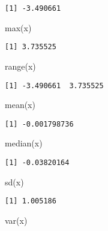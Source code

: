 \documentclass[
  letterpaper,
  DIV=11,
  numbers=noendperiod]{scrreprt}
\newenvironment{Shaded}{\begin{snugshade}}{\end{snugshade}}
\newcommand{\FunctionTok}[1]{\textcolor[rgb]{0.28,0.35,0.67}{#1}}
\newcommand{\NormalTok}[1]{\textcolor[rgb]{0.00,0.23,0.31}{#1}}
\begin{document}
\begin{verbatim}
[1] -3.490661
\end{verbatim}

\begin{Shaded}
\begin{Highlighting}[]
\FunctionTok{max}\NormalTok{(x)}
\end{Highlighting}
\end{Shaded}

\begin{verbatim}
[1] 3.735525
\end{verbatim}

\begin{Shaded}
\begin{Highlighting}[]
\FunctionTok{range}\NormalTok{(x)}
\end{Highlighting}
\end{Shaded}

\begin{verbatim}
[1] -3.490661  3.735525
\end{verbatim}

\begin{Shaded}
\begin{Highlighting}[]
\FunctionTok{mean}\NormalTok{(x)}
\end{Highlighting}
\end{Shaded}

\begin{verbatim}
[1] -0.001798736
\end{verbatim}

\begin{Shaded}
\begin{Highlighting}[]
\FunctionTok{median}\NormalTok{(x)}
\end{Highlighting}
\end{Shaded}

\begin{verbatim}
[1] -0.03820164
\end{verbatim}

\begin{Shaded}
\begin{Highlighting}[]
\FunctionTok{sd}\NormalTok{(x)}
\end{Highlighting}
\end{Shaded}

\begin{verbatim}
[1] 1.005186
\end{verbatim}

\begin{Shaded}
\begin{Highlighting}[]
\FunctionTok{var}\NormalTok{(x)}
\end{Highlighting}
\end{Shaded}
\end{document}
